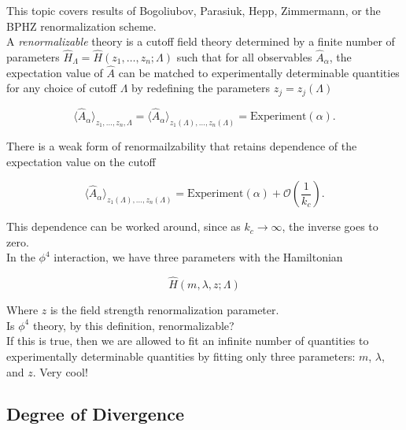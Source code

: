 \noindent This topic covers results of Bogoliubov, Parasiuk, Hepp, Zimmermann, or the BPHZ renormalization scheme. \\

\noindent A \textit{renormalizable} theory is a cutoff field theory determined by a finite number of parameters $\hat{H}_\Lambda = \hat{H} (z_1, \dots, z_n; \Lambda)$ such that for all observables $\hat{A}_\alpha$, the expectation value of $\hat{A}$ can be matched to experimentally determinable quantities for any choice of cutoff $\Lambda$ by redefining the parameters $z_j = z_j (\Lambda)$

\begin{equation}
\langle \hat{A}_\alpha \rangle _{z_1, \dots, z_n, \Lambda} = \langle \hat{A}_\alpha \rangle _{z_1 (\Lambda), \dots, z_n (\Lambda)} = \text{Experiment} (\alpha) .
\end{equation}

\noindent There is a weak form of renormailzability that retains dependence of the expectation value on the cutoff

\begin{equation}
\langle \hat{A}_\alpha \rangle _{z_1 (\Lambda), \dots, z_n (\Lambda)} = \text{Experiment} (\alpha) + \mathcal{O} \left(\frac{1}{k_c}\right).
\end{equation}

\noindent This dependence can be worked around, since as $k_c \rightarrow \infty$, the inverse goes to zero. \\

\noindent In the $\phi^4$ interaction, we have three parameters with the Hamiltonian

\begin{equation}
\hat{H} (m, \lambda, z ; \Lambda)
\end{equation}

\noindent Where $z$ is the field strength renormalization parameter. \\

\noindent Is $\phi^4$ theory, by this definition, renormalizable? \\

\noindent If this is true, then we are allowed to fit an infinite number of quantities to experimentally determinable quantities by fitting only three parameters: $m$, $\lambda$, and $z$. Very cool! \\

\subsection*{Degree of Divergence}

